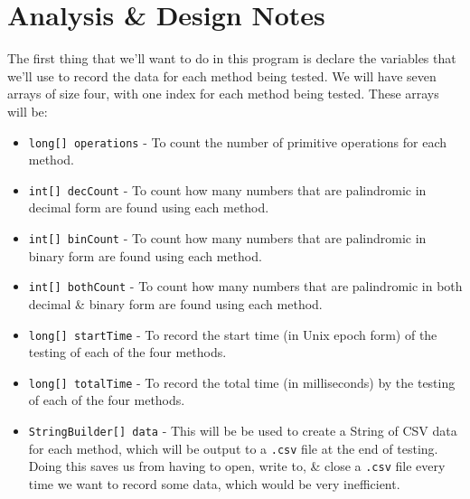 \documentclass[a4paper]{article}
\begin{document}
\section{Analysis \& Design Notes}
The first thing that we'll want to do in this program is declare the variables that we'll use to record the data for each method being tested. 
We will have seven arrays of size four, with one index for each method being tested. 
These arrays will be:
\begin{itemize}
    \item   \verb|long[] operations| - To count the number of primitive operations for each method.
    \item   \verb|int[] decCount| - To count how many numbers that are palindromic in decimal form are found using each method.
    \item   \verb|int[] binCount| - To count how many numbers that are palindromic in binary form are found using each method.
    \item   \verb|int[] bothCount| - To count how many numbers that are palindromic in both decimal \& binary form are found using each method.
    \item   \verb|long[] startTime| - To record the start time (in Unix epoch form) of the testing of each of the four methods.
    \item   \verb|long[] totalTime| - To record the total time (in milliseconds) by the testing of each of the four methods.
    \item   \verb|StringBuilder[] data| - This will be be used to create a String of CSV data for each method, which will be output to a \verb|.csv| file at the end of testing.
            Doing this saves us from having to open, write to, \& close a \verb|.csv| file every time we want to record some data, which would be very inefficient.
\end{itemize}
\end{document}
